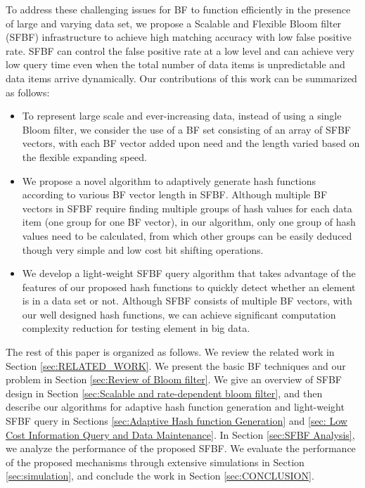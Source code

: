 \documentclass[10pt,journal,letterpaper]{IEEEtran}
\begin{document}
To address these challenging issues for BF to function efficiently in the presence of large and varying data set, we propose a Scalable and Flexible Bloom filter (SFBF) infrastructure to achieve high matching accuracy with low false positive rate. SFBF can control the false positive rate at a low level and can achieve very low query time even when the total number of data items is unpredictable and data items arrive dynamically. Our contributions of this work can be summarized as follows:
\begin{itemize}
  \item To represent large scale and ever-increasing data, instead of using a single Bloom filter, we consider the use of a BF set consisting of an array of SFBF vectors, with each BF vector added upon need and the length varied based on the flexible expanding speed.
  \item We propose a novel algorithm to adaptively generate hash functions according to various BF vector length in SFBF. Although multiple BF vectors in SFBF require finding multiple groups of hash values for each data item (one group for one BF vector), in our algorithm, only one group of hash values need to be calculated, from which other groups can be easily deduced though very simple and low cost bit shifting operations.
  \item We develop a light-weight SFBF query algorithm that takes advantage of the features of our proposed hash functions to quickly detect whether an element is in a data set or not. Although SFBF consists of multiple BF vectors, with our well designed hash functions, we can achieve significant computation complexity reduction for testing element in big data.
\end{itemize}


The rest of this paper is organized as follows. We review the related work in Section \ref{sec:RELATED_WORK}. We present the basic BF techniques and  our problem in Section \ref{sec:Review of Bloom filter}. We give an overview of SFBF design in Section \ref{sec:Scalable and rate-dependent bloom filter}, and then describe our algorithms for adaptive hash function generation and light-weight SFBF query in Sections \ref{sec:Adaptive Hash function Generation} and \ref{sec: Low Cost Information Query and Data Maintenance}. In Section \ref{sec:SFBF Analysis}, we analyze the performance of the proposed SFBF. We evaluate the performance of the proposed mechanisms through extensive simulations in Section \ref{sec:simulation}, and conclude the work in Section \ref{sec:CONCLUSION}.
\end{document}
